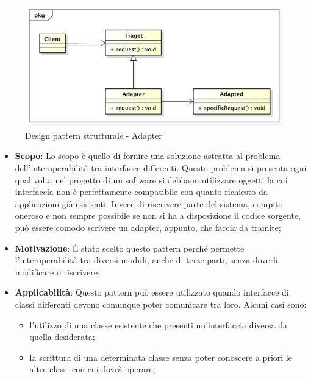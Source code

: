 		\begin{figure}[htbp]
			\centering
			\centerline{\includegraphics[scale=0.5]{./images/designpatternappendice/adapter.pdf}}
			\caption{Design pattern strutturale - Adapter}
		\end{figure}

		\begin{itemize}
			\item \textbf{Scopo}: Lo scopo è quello di fornire una soluzione astratta al problema dell'interoperabilità tra interfacce differenti. Questo problema si presenta ogni qual volta nel progetto di un software si debbano utilizzare oggetti la cui interfaccia non è perfettamente compatibile con quanto richiesto da applicazioni già esistenti. Invece di riscrivere parte del sistema, compito oneroso e non sempre possibile se non si ha a disposizione il codice sorgente, può essere comodo scrivere un adapter, appunto, che faccia da tramite;

			\item \textbf{Motivazione}: \'E stato scelto questo pattern perché permette l'interoperabilità tra diversi moduli, anche di terze parti, senza doverli modificare o riscrivere;

			\item \textbf{Applicabilità}: Questo pattern può essere utilizzato quando interfacce di classi differenti devono comunque poter comunicare tra loro. Alcuni casi sono:
			\begin{itemize}
			\item l'utilizzo di una classe esistente che presenti un'interfaccia diversa da quella desiderata;
			\item la scrittura di una determinata classe senza poter conoscere a priori le altre classi con cui dovrà operare;
			\end{itemize}

		\end{itemize}


